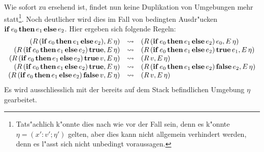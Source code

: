 \documentclass[12pt,a4paper,draft]{article}
\begin{document}
Wie sofort zu ersehend ist, findet nun keine Duplikation von Umgebungen mehr statt\footnote{Tats"achlich
k"onnte dies nach wie vor der Fall sein, denn es k"onnte $\eta = (x':v';\eta')$ gelten, aber dies kann
nicht allgemein verhindert werden, denn es l"asst sich nicht unbedingt voraussagen.}. Noch deutlicher
wird dies im Fall von bedingten Ausdr"ucken $\mathbf{if}\,{e_0}\,\mathbf{then}\,{e_1}\,\mathbf{else}\,{e_2}$. Hier ergeben sich folgende Regeln:
\[\begin{array}{rcl}
  (R\,(\mathbf{if}\,{e_0}\,\mathbf{then}\,{e_1}\,\mathbf{else}\,{e_2}),E\,\eta)
  &\rightsquigarrow& (R\,(\mathbf{if}\,{e_0}\,\mathbf{then}\,{e_1}\,\mathbf{else}\,{e_2})\,e_0,E\,\eta) \\
  (R\,(\mathbf{if}\,{e_0}\,\mathbf{then}\,{e_1}\,\mathbf{else}\,{e_2})\,\mathbf{true},E\,\eta)
  &\rightsquigarrow& (R\,(\mathbf{if}\,{e_0}\,\mathbf{then}\,{e_1}\,\mathbf{else}\,{e_2})\,\mathbf{true}\,e_1,E\,\eta) \\
  (R\,(\mathbf{if}\,{e_0}\,\mathbf{then}\,{e_1}\,\mathbf{else}\,{e_2})\,\mathbf{true}\,v,E\,\eta)
  &\rightsquigarrow& (R\,v,E\,\eta) \\
  (R\,(\mathbf{if}\,{e_0}\,\mathbf{then}\,{e_1}\,\mathbf{else}\,{e_2})\,\mathbf{true},E\,\eta)
  &\rightsquigarrow& (R\,(\mathbf{if}\,{e_0}\,\mathbf{then}\,{e_1}\,\mathbf{else}\,{e_2})\,\mathbf{false}\,e_2,E\,\eta) \\
  (R\,(\mathbf{if}\,{e_0}\,\mathbf{then}\,{e_1}\,\mathbf{else}\,{e_2})\,\mathbf{false}\,v,E\,\eta)
  &\rightsquigarrow& (R\,v,E\,\eta) \\
\end{array}\]
Es wird ausschliesslich mit der bereits auf dem Stack befindlichen Umgebung $\eta$ gearbeitet.
\end{document}
